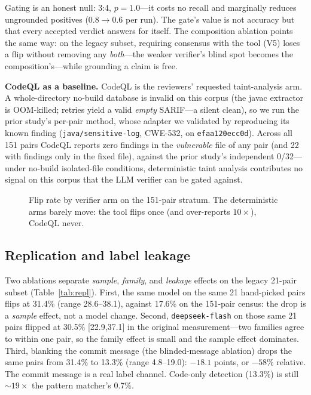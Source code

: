 \documentclass[conference]{IEEEtran}
\newcommand{\code}[1]{\texttt{#1}}
\begin{document}
Gating is an honest null: 3:4, $p{=}1.0$---it costs no recall and marginally
reduces ungrounded positives (0.8$\to$0.6 per run). The gate's value is not
accuracy but that every accepted verdict answers for itself. The composition
ablation points the same way: on the legacy subset, requiring consensus with the
tool (V5) loses a flip without removing any \emph{both}---the weaker verifier's
blind spot becomes the composition's---while grounding a claim is free.

\textbf{CodeQL as a baseline.} CodeQL is the reviewers' requested taint-analysis
arm. A whole-directory no-build database is invalid on this corpus (the javac
extractor is OOM-killed; retries yield a valid \emph{empty} SARIF---a silent
clean), so we run the prior study's per-pair method, whose adapter we validated
by reproducing its known finding (\code{java/sensitive-log}, CWE-532, on
\code{efaa120ecc0d}). Across all 151 pairs CodeQL reports zero findings in the
\emph{vulnerable} file of any pair (and 22 with findings only in the fixed
file), against the prior study's independent 0/32---under no-build isolated-file
conditions, deterministic taint analysis contributes no signal on this corpus
that the LLM verifier can be gated against.

\begin{figure}[t]
\centering
{}
\caption{Flip rate by verifier arm on the 151-pair stratum. The deterministic
arms barely move: the tool flips once (and over-reports $10\times$), CodeQL
never.}
\label{fig:arms}
\end{figure}

\subsection{Replication and label leakage}
Two ablations separate \emph{sample}, \emph{family}, and \emph{leakage} effects
on the legacy 21-pair subset (Table~\ref{tab:repl}). First, the same model on
the same 21 hand-picked pairs flips at 31.4\% (range 28.6--38.1), against
17.6\% on the 151-pair census: the drop is a \emph{sample} effect, not a model
change. Second, \code{deepseek-flash} on those same 21 pairs flipped at 30.5\%
[22.9,37.1] in the original measurement---two families agree to within one pair,
so the family effect is small and the sample effect dominates. Third, blanking
the commit message (the blinded-message ablation) drops the same pairs from
31.4\% to 13.3\% (range 4.8--19.0): $-18.1$ points, or $-58\%$ relative. The
commit message is a real label channel. Code-only detection (13.3\%) is still
${\sim}19\times$ the pattern matcher's 0.7\%.
\end{document}

